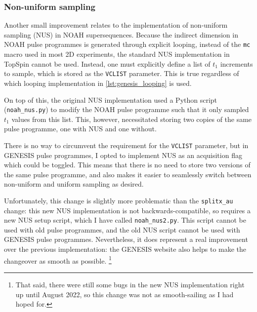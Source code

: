 \subsubsection{Non-uniform sampling}

Another small improvement relates to the implementation of non-uniform sampling (NUS) in NOAH supersequences.
Because the indirect dimension in NOAH pulse programmes is generated through explicit looping, instead of the \texttt{mc} macro used in most 2D experiments, the standard NUS implementation in TopSpin cannot be used.
Instead, one must explicitly define a list of $t_1$ increments to sample, which is stored as the \texttt{VCLIST} parameter.
This is true regardless of which looping implementation in \cref{lst:genesis_looping} is used.

On top of this, the original NUS implementation\autocite{Claridge2019MRC} used a Python script (\texttt{noah\_nus.py}) to modify the NOAH pulse programme such that it only sampled $t_1$ values from this list.
This, however, necessitated storing two copies of the same pulse programme, one with NUS and one without.

There is no way to circumvent the requirement for the \texttt{VCLIST} parameter, but in GENESIS pulse programmes, I opted to implement NUS as an acquisition flag which could be toggled.
This means that there is no need to store two versions of the same pulse programme, and also makes it easier to seamlessly switch between non-uniform and uniform sampling as desired.

Unfortunately, this change is slightly more problematic than the \texttt{splitx\_au} change: this new NUS implementation is not backwards-compatible, so requires a new NUS setup script, which I have called \texttt{noah\_nus2.py}.
This script cannot be used with old pulse programmes, and the old NUS script cannot be used with GENESIS pulse programmes.
Nevertheless, it does represent a real improvement over the previous implementation: the GENESIS website also helps to make the changeover as smooth as possible.%
\footnote{That said, there were still some bugs in the new NUS implementation right up until August 2022, so this change was not as smooth-sailing as I had hoped for.}
